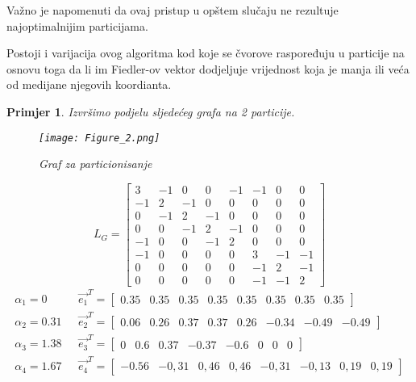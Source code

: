 \documentclass[11pt]{article}
\newtheorem{example}{Primjer}
\begin{document}
		Važno je napomenuti da ovaj pristup u opštem slučaju ne rezultuje najoptimalnijim particijama.

		Postoji i varijacija ovog algoritma kod koje se čvorove raspoređuju u particije na osnovu toga da li im Fiedler-ov vektor dodjeljuje vrijednost koja je manja ili veća od medijane njegovih koordianta.
	\newpage
	\begin{example}
		Izvršimo podjelu sljedećeg grafa na 2 particije.
		\begin{figure}[h]
			\centering
			\texttt{[image: Figure\_2.png]}
			\caption{Graf za particionisanje}
		\end{figure}
		
		\[ 
			L_G =
			\begin{bmatrix}
				3 & -1 & 0 & 0 & -1 & -1 & 0 & 0 \\
				-1 & 2 & -1 & 0 & 0 & 0 & 0 & 0 \\
				0 & -1 & 2 & -1 & 0 & 0 & 0 & 0 \\
				0 & 0 & -1 & 2 & -1 & 0 & 0 & 0 \\
				-1 & 0 & 0 & -1 & 2 & 0 & 0 & 0 \\
				-1 & 0 & 0 & 0 & 0 & 3 & -1 & -1 \\
				0 & 0 & 0 & 0 & 0 & -1 & 2 & -1 \\
				0 & 0 & 0 & 0 & 0 & -1 & -1 & 2
			\end{bmatrix}
			\]
			\[
				\begin{split}
					\alpha_1=0 \texttt{~~~~} & \vec{e_1}^T = \begin{bmatrix} 0.35  &   0.35  &  0.35  &  0.35  &  0.35  &  0.35  &  0.35  &  0.35      \end{bmatrix} \\ 
					\alpha_2=0.31 \texttt{~~} & \vec{e_2}^T = \begin{bmatrix} 0.06  &   0.26  &  0.37  &  0.37  &  0.26  &  -0.34  &  -0.49  &  -0.49  \end{bmatrix} \\ 
					\alpha_3=1.38 \texttt{~~} & \vec{e_3}^T = \begin{bmatrix} 0  &  0.6  &  0.37  &  -0.37  &  -0.6  &  0  &  0  &  0                  \end{bmatrix} \\
					\alpha_4=1.67 \texttt{~~} & \vec{e_4}^T = \begin{bmatrix} -0.56  &  -0,31  &  0,46  &  0,46  &  -0,31  &  -0,13  &  0,19  &  0,19   \end{bmatrix} \\

\end{split}\]
\end{example}
\end{document}
